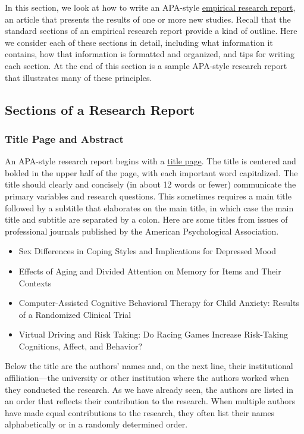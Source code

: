 \documentclass[
]{krantz}
\providecommand{\tightlist}{%
  \setlength{\itemsep}{0pt}\setlength{\parskip}{0pt}}
\begin{document}
In this section, we look at how to write an APA-style \hyperref[empirical-research-report]{empirical research report}, an article that presents the results of one or more new studies. Recall that the standard sections of an empirical research report provide a kind of outline. Here we consider each of these sections in detail, including what information it contains, how that information is formatted and organized, and tips for writing each section. At the end of this section is a sample APA-style research report that illustrates many of these principles.

\subsection*{Sections of a Research Report}\label{sections-of-a-research-report}


\subsubsection*{Title Page and Abstract}\label{title-page-and-abstract}


An APA-style research report begins with a \hyperref[title-page]{title page}. The title is centered and bolded in the upper half of the page, with each important word capitalized. The title should clearly and concisely (in about 12 words or fewer) communicate the primary variables and research questions. This sometimes requires a main title followed by a subtitle that elaborates on the main title, in which case the main title and subtitle are separated by a colon. Here are some titles from issues of professional journals published by the American Psychological Association.

\begin{itemize}
\tightlist
\item
  Sex Differences in Coping Styles and Implications for Depressed Mood
\item
  Effects of Aging and Divided Attention on Memory for Items and Their Contexts
\item
  Computer-Assisted Cognitive Behavioral Therapy for Child Anxiety: Results of a Randomized Clinical Trial
\item
  Virtual Driving and Risk Taking: Do Racing Games Increase Risk-Taking Cognitions, Affect, and Behavior?
\end{itemize}

Below the title are the authors' names and, on the next line, their institutional affiliation---the university or other institution where the authors worked when they conducted the research. As we have already seen, the authors are listed in an order that reflects their contribution to the research. When multiple authors have made equal contributions to the research, they often list their names alphabetically or in a randomly determined order.
\end{document}

